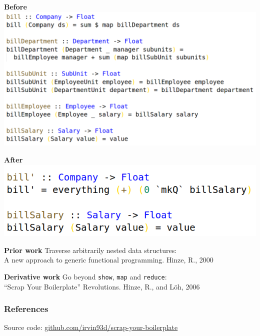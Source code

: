 \documentclass[14pt]{beamer}
\begin{document}
\begin{frame}
  \textbf{Before}
  \vfill
  \includegraphics[height=0.8\textheight,width=\textwidth,keepaspectratio]{graphics/bill-naive-hs.png}
  \vfill
\end{frame}

\begin{frame}
  \textbf{After}
  \vfill
  \includegraphics[height=0.8\textheight,width=\textwidth,keepaspectratio]{graphics/bill-hs.png}
  \vfill
\end{frame}

\begin{frame}
  \textbf{Prior work}
  \vfill
    Traverse arbitrarily nested data structures:\\
    A new approach to generic functional programming. Hinze, R., 2000 \cite{hinze2000new}
  \vfill
\end{frame}

\begin{frame}
  \textbf{Derivative work}
  \vfill
    Go beyond \texttt{show}, \texttt{map} and \texttt{reduce}:\\
    ``Scrap Your Boilerplate'' Revolutions. Hinze, R., and L\"{o}h, 2006 \cite{hinze2006scrap}
  \vfill
\end{frame}

\begin{frame}[fragile]\frametitle{References}
  
  \small{Source code: \href{https://github.com/irvin93d/scrap-your-boilerplate}{github.com/irvin93d/scrap-your-boilerplate}}
\end{frame}
\end{document}
